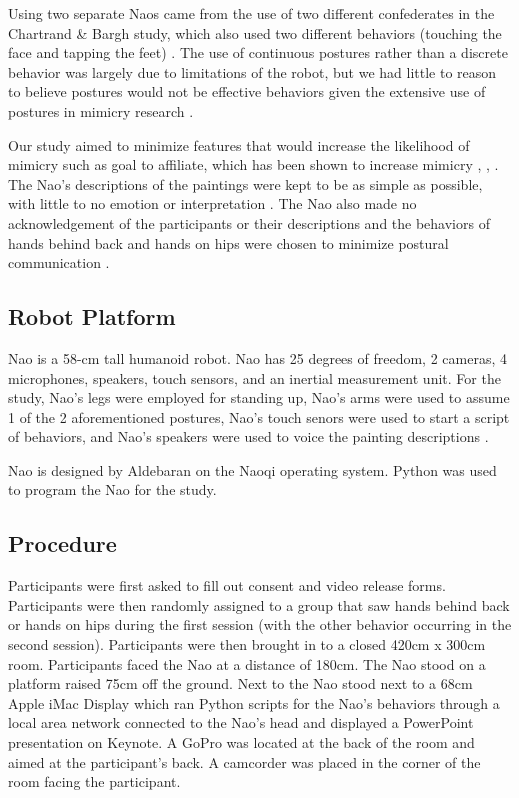 \documentclass{acm_proc_article-sp}
\begin{document}
Using two separate Naos came from the use of two different confederates in  the Chartrand \& Bargh study, which also used two different behaviors (touching the face and tapping the feet) \cite{chartrand1999chameleon}. The use of continuous postures rather than a discrete behavior was largely due to limitations of the robot, but we had little to reason to believe postures would not be effective behaviors given the extensive use of postures in mimicry research \cite{chartrand2013antecedents}. 

Our study aimed to minimize features that would increase the likelihood of mimicry such as goal to affiliate, which has been shown to increase mimicry \cite{chartrand2013antecedents}, \cite{drury2006effects}, \cite{lakin2003using}. The Nao's descriptions of the paintings were kept to be as simple as possible, with little to no emotion or interpretation \cite{hofree2014bridging}. The Nao also made no acknowledgement of the participants or their descriptions and the behaviors of hands behind back and hands on hips were chosen to minimize postural communication . 

\subsection{Robot Platform}
Nao is a 58-cm tall humanoid robot. Nao has 25 degrees of freedom, 2 cameras, 4 microphones, speakers, touch sensors, and an inertial measurement unit. For the study, Nao's legs were employed for standing up, Nao's arms were used to assume 1 of the 2 aforementioned postures, Nao's touch senors were used to start a script of behaviors, and Nao's speakers were used to voice the painting descriptions \cite{naodocumentation}. 

Nao is designed by Aldebaran on the Naoqi operating system. Python was used to program the Nao for the study. 

\subsection{Procedure}
Participants were first asked to fill out consent and video release forms. Participants were then randomly assigned to a group that saw hands behind back or hands on hips during the first session (with the other behavior occurring in the second session). Participants were then brought in to a closed 420cm x 300cm room. Participants faced the Nao at a distance of 180cm. The Nao stood on a platform raised 75cm off the ground. Next to the Nao stood next to a 68cm Apple iMac Display which ran Python scripts for the Nao's behaviors through a local area network connected to the Nao's head and displayed a PowerPoint presentation on Keynote. A GoPro was located at the back of the room and aimed at the participant's back. A camcorder was placed in the corner of the room facing the participant.
\end{document}
